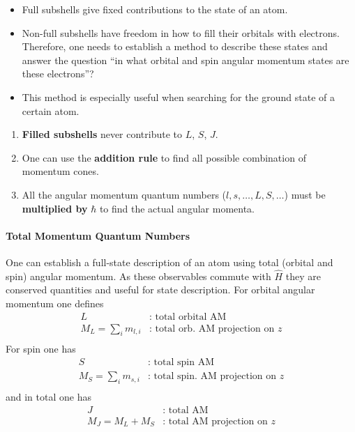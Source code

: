 \begin{itemize}
    \item Full subshells give fixed contributions to the state of an atom.
    \item Non-full subshells have freedom in how to fill their orbitals with electrons. Therefore, one needs to establish a method to describe these states and answer the question ``in what orbital and spin angular momentum states are these electrons''?
    \item This method is especially useful when searching for the ground state of a certain atom.
\end{itemize}


\begin{enumerate}
    \item \textbf{Filled subshells} never contribute to $L$, $S$, $J$.
    \item One can use the \textbf{addition rule} to find all possible combination of momentum cones.
    \item All the angular momentum quantum numbers ($l,s,\dots,L,S,\dots$) must be \textbf{multiplied by} $\boldsymbol{\hbar}$ to find the actual angular momenta.
\end{enumerate}

\paragraph{Total Momentum Quantum Numbers}


One can establish a full-state description of an atom using total (orbital and spin) angular momentum. As these observables commute with $\hat{H}$ they are conserved quantities and useful for state description. For orbital angular momentum one defines
\begin{align*}
    L                   & \text{: total orbital AM}                \\
    M_L=\sum_{i}m_{l,i} & \text{: total orb. AM projection on $z$} \\
\end{align*}
For spin one has
\begin{align*}
    S                   & \text{: total spin AM}                    \\
    M_S=\sum_{i}m_{s,i} & \text{: total spin. AM projection on $z$} \\
\end{align*}
and in total one has
\begin{align*}
    J           & \text{: total AM}                   \\
    M_J=M_L+M_S & \text{: total AM projection on $z$} \\
\end{align*}

